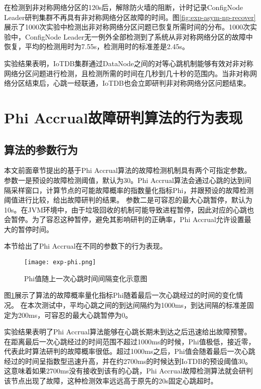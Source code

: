 在检测到非对称网络分区的120s后，解除防火墙的阻断，计时记录ConfigNode Leader研判集群不再具有非对称网络分区故障的时间。图\ref{fig:exp-asym-np-recover}展示了1000次实验中检测出非对称网络分区问题已恢复所需时间的分布。1000次实验中，ConfigNode Leader无一例外全部检测到了系统从非对称网络分区的故障中恢复，平均的检测用时为7.55s，检测用时的标准差是2.45s。

实验结果表明，IoTDB集群通过DataNode之间的对等心跳机制能够有效对非对称网络分区问题进行检测，且检测所需的时间在几秒到几十秒的范围内。当非对称网络分区结束后，心跳一经联通，IoTDB也会立即研判非对称网络分区问题结束。


\section{Phi Accrual故障研判算法的行为表现}

\subsection{算法的参数行为}

本文前面章节提出的基于Phi Accrual算法的故障检测机制具有两个可指定参数。
参数一是预设的故障检测阈值，默认为30。Phi Accrual算法会通过心跳的达到间隔采样窗口，计算节点的可能故障概率的指数量化指标Phi，并跟预设的故障检测阈值进行比较，给出故障研判的结果。
参数二是可容忍的最大心跳暂停，默认为10s。在JVM环境中，由于垃圾回收的机制可能导致进程暂停，因此对应的心跳也会暂停。为了容忍这种暂停，避免其影响研判的正确率，Phi Accrual允许设置最大的暂停时间。

本节给出了Phi Accrual在不同的参数下的行为表现。

\begin{figure}
    \centering
    \texttt{[image: exp-phi.png]}
    \caption{Phi值随上一次心跳时间间隔变化示意图}
    \label{fig:exp-phi}
\end{figure}

图\ref{fig:exp-phi}展示了算法的故障概率量化指标Phi随着最后一次心跳经过的时间的变化情况。
在本次测试中，平均心跳之间的到达间隔约为1000ms，到达间隔的标准差固定为200ms，可容忍的最大心跳暂停为0。

实验结果表明了Phi Accrual算法能够在心跳长期未到达之后迅速给出故障预警。在距离最后一次心跳经过的时间范围不超过1000ms的时候，Phi值极低，接近零，代表此时算法研判的故障概率很低。超过1000ms之后，Phi值会随着最后一次心跳经过的时间呈指数型迅速升高，并在约2700ms的时候达到IoTDB的预设阈值30。这意味着如果2700ms没有接收到该有的心跳，Phi Accrual故障检测算法就会研判该节点出现了故障，这种检测效率远远高于原先的20s固定心跳超时。


